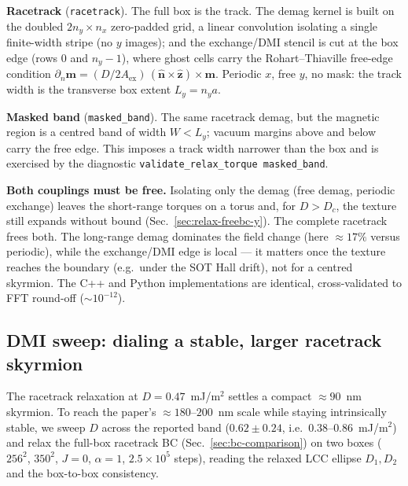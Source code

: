 \documentclass[11pt,a4paper]{article}
\newcommand{\mb}[1]{\mathbf{#1}}
\newcommand{\Aex}{A_{\text{ex}}}
\begin{document}
\textbf{Racetrack} (\texttt{racetrack}). The full box is the track. The
demag kernel is built on the doubled $2n_y\times n_x$ zero-padded grid,
a linear convolution isolating a single finite-width stripe (no $y$
images); and the exchange/DMI stencil is cut at the box edge (rows $0$
and $n_y-1$), where ghost cells carry the Rohart--Thiaville free-edge
condition
$\partial_n\mb{m} = (D/2\Aex)\,(\hat{\mb{n}}\times\hat{\mb{z}})\times
\mb{m}$. Periodic $x$, free $y$, no mask: the track width is the
transverse box extent $L_y=n_y a$.

\textbf{Masked band} (\texttt{masked\_band}). The same racetrack demag,
but the magnetic region is a centred band of width $W<L_y$; vacuum
margins above and below carry the free edge. This imposes a track width
narrower than the box and is exercised by the diagnostic
\texttt{validate\_relax\_torque masked\_band}.

\textbf{Both couplings must be free.} Isolating only the demag (free
demag, periodic exchange) leaves the short-range torques on a torus and,
for $D>D_c$, the texture still expands without bound
(Sec.~\ref{sec:relax-freebc-y}). The complete racetrack frees both. The
long-range demag dominates the field change (here $\approx 17\%$ versus
periodic), while the exchange/DMI edge is local --- it matters once the
texture reaches the boundary (e.g.\ under the SOT Hall drift), not for a
centred skyrmion. The C++ and Python implementations are identical,
cross-validated to FFT round-off ($\sim10^{-12}$).

\subsection{DMI sweep: dialing a stable, larger racetrack skyrmion}
\label{sec:dmi-sweep}

The racetrack relaxation at $D=0.47$~mJ/m$^2$ settles a compact
$\approx 90$~nm skyrmion. To reach the paper's $\approx 180$--$200$~nm
scale while staying intrinsically stable, we sweep $D$ across the
reported band ($0.62\pm0.24$, i.e.\ $0.38$--$0.86$~mJ/m$^2$) and relax
the full-box racetrack BC (Sec.~\ref{sec:bc-comparison}) on two boxes
($256^2$, $350^2$, $J=0$, $\alpha=1$, $2.5\times10^{5}$ steps), reading
the relaxed LCC ellipse $D_1,D_2$ and the box-to-box consistency.
\end{document}

